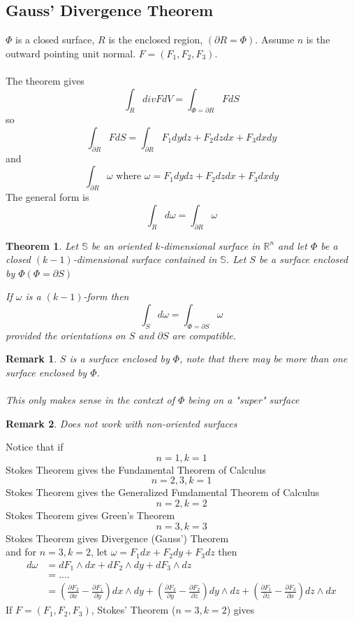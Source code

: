\documentclass[12pt]{article}
\theoremstyle{plain}
\newtheorem*{remark}{Remark}
\newtheorem{theorem}{Theorem}[section]
\theoremstyle{definition}
\begin{document}
\subsection{Gauss' Divergence Theorem}

$\Phi$ is a closed surface, $R$ is the enclosed region, $(\partial R = \Phi)$. Assume $n$ is the outward pointing unit normal. $F = (F_1, F_2, F_3)$.\\
\\
The theorem gives
$$\int_R div F dV = \int_{\Phi= \partial R} F dS$$
so
$$\int_{\partial R} F dS = \int_{\partial R} F_1dydz + F_2dzdx + F_3 dxdy$$
and
$$\int_{\partial R} \omega \text{ where } \omega = F_1dydz + F_2dzdx + F_3 dxdy$$
The general form is
$$\int_R d\omega = \int_{\partial R} \omega$$

\begin{theorem}
	Let $\mathbb{S}$ be an oriented $k$-dimensional surface in $\mathbb{R}^n$ and let $\Phi$ be a closed $(k-1)$-dimensional surface contained in $\mathbb{S}$. Let $S$ be a surface enclosed by $\Phi (\Phi= \partial S)$

	If $\omega$ is a $(k-1)$-form then
	$$\int_S d\omega = \int_{\Phi = \partial S} \omega$$
	provided the orientations on $S$ and $\partial S$ are compatible.
\end{theorem}

\begin{remark}
	$S$ is a surface enclosed by $\Phi$, note that there may be more than one surface enclosed by $\Phi$.\\
	\\
	This only makes sense in the context of $\Phi$ being on a "super" surface
\end{remark}

\begin{remark}
	Does not work with non-oriented surfaces
\end{remark}

Notice that if
$$n=1, k=1$$
Stokes Theorem gives the Fundamental Theorem of Calculus
$$n=2,3, k=1$$
Stokes Theorem gives the Generalized Fundamental Theorem of Calculus
$$n = 2, k = 2$$
Stokes Theorem gives Green's Theorem
$$n=3, k=3$$
Stokes Theorem gives Divergence (Gauss') Theorem\\
and for $n=3, k=2$, let $\omega = F_1 dx + F_2 dy + F_3 dz$ then
\begin{align*}
	d\omega &= dF_1 \wedge dx + dF_2 \wedge dy + dF_3 \wedge dz\\
	&= ....\\
	&= (\frac{\partial F_2}{\partial x} - \frac{\partial F_1}{\partial y})dx \wedge dy + (\frac{\partial F_3}{\partial y} - \frac{\partial F_2}{\partial z})dy \wedge dz + (\frac{\partial F_1}{\partial z} - \frac{\partial F_3}{\partial x})dz \wedge dx
\end{align*}
If $F=(F_1, F_2, F_3)$, Stokes' Theorem ($n=3, k=2$) gives
\end{document}
